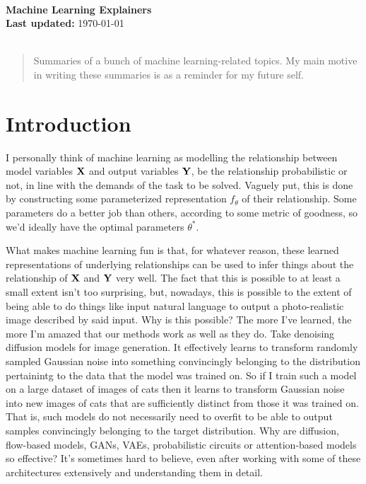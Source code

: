 \documentclass[11pt]{article}
\begin{document}
\begin{center}
\HRule\\[0.6cm]
{\huge\bfseries Machine Learning Explainers}\\[0.2cm]
\textbf{Last updated:} \today\\
\HRule\\[0.6cm]
\end{center}

\begin{abstract}
    \noindent Summaries of a bunch of machine learning-related topics. My main motive in writing these summaries is as a reminder for my future self.
\end{abstract}

\setcounter{tocdepth}{2}{\small\tableofcontents}

\section{Introduction}

I personally think of machine learning as modelling the relationship between model variables $\mathbf{X}$ and output variables $\mathbf{Y}$, be the relationship probabilistic or not, in line with the demands of the task to be solved. Vaguely put, this is done by constructing some parameterized representation $f_{\theta}$ of their relationship. Some parameters do a better job than others, according to some metric of goodness, so we'd ideally have the optimal parameters $\theta^{*}$.

What makes machine learning fun is that, for whatever reason, these learned representations of underlying relationships can be used to infer things about the relationship of $\mathbf{X}$ and $\mathbf{Y}$ very well. The fact that this is possible to at least a small extent isn't too surprising, but, nowadays, this is possible to the extent of being able to do things like input natural language to output a photo-realistic image described by said input. Why is this possible? The more I've learned, the more I'm amazed that our methods work as well as they do. Take denoising diffusion models for image generation. It effectively learns to transform randomly sampled Gaussian noise into something convincingly belonging to the distribution pertainintg to the data that the model was trained on. So if I train such a model on a large dataset of images of cats then it learns to transform Gaussian noise into new images of cats that are sufficiently distinct from those it was trained on. That is, such models do not necessarily need to overfit to be able to output samples convincingly belonging to the target distribution. Why are diffusion, flow-based models, GANs, VAEs, probabilistic circuits or attention-based models so effective? It's sometimes hard to believe, even after working with some of these architectures extensively and understanding them in detail.
\end{document}
